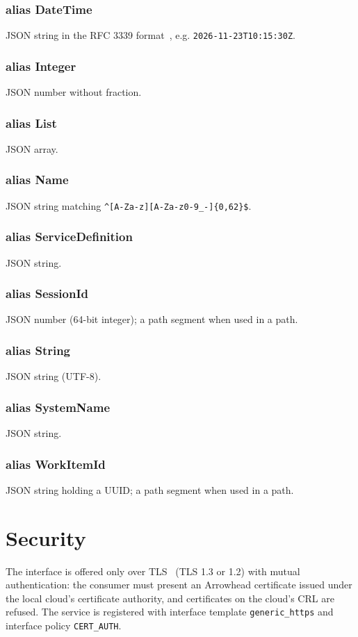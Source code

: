 \documentclass[a4paper]{arrowhead}
\newcommand{\pdef}[1]{{\textcolor{ArrowheadGrey}{#1\label{sec:model:primitives:#1}\label{sec:model:primitives:#1s}}}}
\begin{document}
\subsubsection*{alias \pdef{DateTime}}
JSON string in the RFC 3339 format~\cite{rfc3339}, e.g. \texttt{2026-11-23T10:15:30Z}.

\subsubsection*{alias \pdef{Integer}}
JSON number without fraction.

\subsubsection*{alias \pdef{List}}
JSON array.

\subsubsection*{alias \pdef{Name}}
JSON string matching \texttt{\^{}[A-Za-z][A-Za-z0-9\_-]\{0,62\}\$}.

\subsubsection*{alias \pdef{ServiceDefinition}}
JSON string.

\subsubsection*{alias \pdef{SessionId}}
JSON number (64-bit integer); a path segment when used in a path.

\subsubsection*{alias \pdef{String}}
JSON string (UTF-8).

\subsubsection*{alias \pdef{SystemName}}
JSON string.

\subsubsection*{alias \pdef{WorkItemId}}
JSON string holding a UUID; a path segment when used in a path.



\section{Security}
\label{sec:security}
The interface is offered only over TLS~\cite{rfc8446} (TLS 1.3 or 1.2) with mutual authentication: the consumer must
present an Arrowhead certificate issued under the local cloud's certificate authority, and certificates on the
cloud's CRL are refused. The service is registered with interface template \texttt{generic\_https} and interface
policy \texttt{CERT\_AUTH}.
\end{document}
